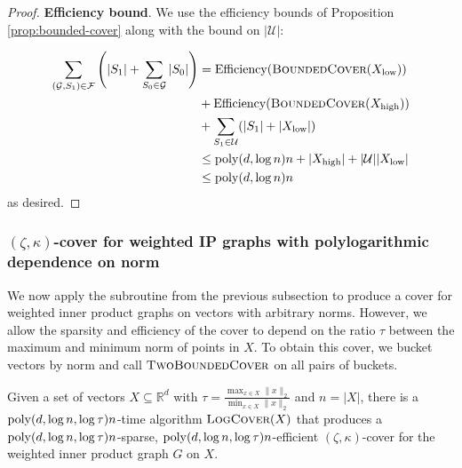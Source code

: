 \begin{proof}
\textbf{Efficiency bound}. We use the efficiency bounds of Proposition \ref{prop:bounded-cover} along with the bound on $|\mathcal U|$:

\begin{align*}
    \sum_{(\mathcal G, S_1)\in \mathcal F} \left(|S_1| + \sum_{S_0\in \mathcal G} |S_0|\right) &= \text{Efficiency}(\textsc{BoundedCover}(X_{\text{low}})) \\
    &+ \text{Efficiency}(\textsc{BoundedCover}(X_{\text{high}})) \\
    &+ \sum_{S_1\in \mathcal U} (|S_1| + |X_{\text{low}}|)\\
    &\le \mathrm{poly}(d,\log n) n + |X_{\text{high}}| + |\mathcal U||X_{\text{low}}|\\
    &\le \mathrm{poly}(d,\log n) n\\
\end{align*}
as desired.
\end{proof}

\subsubsection{\texorpdfstring{$(\zeta,\kappa)$}{}-cover for weighted IP graphs with polylogarithmic dependence on norm}

We now apply the subroutine from the previous subsection to produce a cover for weighted inner product graphs on vectors with arbitrary norms. However, we allow the sparsity and efficiency of the cover to depend on the ratio $\tau$ between the maximum and minimum norm of points in $X$. To obtain this cover, we bucket vectors by norm and call $\textsc{TwoBoundedCover}$ on all pairs of buckets.

\begin{proposition}\label{prop:log-cover}
Given a set of vectors $X\subseteq \mathbb{R}^d$ with $\tau = \frac{\max_{x\in X} \|x\|_2}{\min_{x\in X} \|x\|_2}$ and $n = |X|$, there is a $\mathrm{poly}(d,\log n,\log \tau) n$-time algorithm $\textsc{LogCover}(X)$ that produces a $\mathrm{poly}(d,\log n,\log \tau) n$-sparse, $\mathrm{poly}(d,\log n,\log \tau) n$-efficient $(\zeta,\kappa)$-cover for the weighted inner product graph $G$ on $X$.
\end{proposition}

